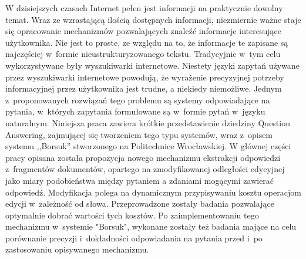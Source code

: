 \documentclass[a4paper, twoside, openright, 12pt]{report}
\newenvironment{abstractpage}
  {\vspace*{\fill}\thispagestyle{empty}}
    {\vfill}
\renewenvironment{abstract}[1]
      {\bigskip\selectlanguage{#1}%
             \begin{center}\bfseries\abstractname\end{center}}
           {\par\bigskip}
\begin{document}
\thispagestyle{empty}
\null\newpage
\thispagestyle{empty}
\cleardoublepage

\thispagestyle{empty}
\begin{abstractpage}
\begin{abstract}{polish}
    W dzisiejszych czasach Internet pełen jest informacji na praktycznie dowolny temat. Wraz ze wzrastającą ilością
    dostępnych informacji, niezmiernie ważne staje się opracowanie mechanizmów pozwalających znaleźć informacje
    interesujące użytkownika. Nie jest to proste, ze względu na to, że informacje te zapisane są najczęściej w~formie
    nieustrukturyzowanego tekstu. Tradycyjnie w~tym celu wykorzystywane były wyszukiwarki internetowe. Niestety
    języki zapytań używane przez wyszukiwarki internetowe powodują, że wyrażenie precyzyjnej potrzeby informacyjnej
    przez użytkownika jest trudne, a niekiedy niemożliwe. Jednym z~proponowanych rozwiązań tego problemu są systemy
    odpowiadające na pytania, w~których zapytania formułowane są w~formie pytań w~języku naturalnym. Niniejsza
    praca zawiera krótkie przedstawienie dziedziny Question Answering, zajmującej się tworzeniem tego typu systemów,
    wraz z~opisem systemu ,,Borsuk'' stworzonego na Politechnice Wrocławskiej.
    W głównej części pracy opisana została propozycja nowego mechanizmu ekstrakcji odpowiedzi z~fragmentów dokumentów,
    opartego na zmodyfikowanej odległości edycyjnej jako miary podobieństwa między pytaniem a zdaniami mogącymi zawierać
    odpowiedź. Modyfikacja polega na dynamicznym przypisywaniu kosztu operacjom edycji w~zależność od słowa. Przeprowadzone
    zostały badania pozwalające optymalnie dobrać wartości tych kosztów. Po zaimplementowaniu tego mechanizmu w~systemie "Borsuk",
    wykonane zostały też badania mające na celu porównanie precyzji i~dokładności odpowiadania na pytania przed i~po
    zastosowaniu opisywanego mechanizmu.
\end{abstract}


\end{abstractpage}
\end{document}
